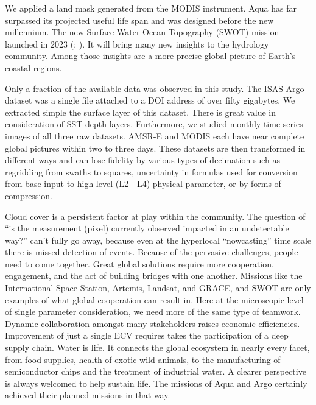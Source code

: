 \begin{refsection}
We applied a land mask generated from the MODIS instrument. Aqua has far surpassed its projected useful life span and was designed before the new millennium. The new Surface Water Ocean Topography (SWOT) mission launched in 2023 (\cite{fu2009swot}; \cite{morrow2019global}). It will bring many new insights to the hydrology community. Among those insights are a more precise global picture of Earth’s coastal regions. 

Only a fraction of the available data was observed in this study. The ISAS Argo dataset was a single file attached to a DOI address of over fifty gigabytes. We extracted simple the surface layer of this dataset. There is great value in consideration of SST depth layers. Furthermore, we studied monthly time series images of all three raw datasets. AMSR-E and MODIS each have near complete global pictures within two to three days. These datasets are then transformed in different ways and can lose fidelity by various types of decimation such as regridding from swaths to squares, uncertainty in formulas used for conversion from base input to high level (L2 - L4) physical parameter, or by forms of compression. 

Cloud cover is a persistent factor at play within the community. The question of “is the measurement (pixel) currently observed impacted in an undetectable way?” can’t fully go away, because even at the hyperlocal “nowcasting” time scale there is missed detection of events. Because of the pervasive challenges, people need to come together. Great global solutions require more cooperation, engagement, and the act of building bridges with one another. Missions like the International Space Station, Artemis, Landsat, and GRACE, and SWOT are only examples of what global cooperation can result in. Here at the microscopic level of single parameter consideration, we need more of the same type of teamwork. Dynamic collaboration amongst many stakeholders raises economic efficiencies. Improvement of just a single ECV requires takes the participation of a deep supply chain. Water is life. It connects the global ecosystem in nearly every facet, from food supplies, health of exotic wild animals, to the manufacturing of semiconductor chips and the treatment of industrial water. A clearer perspective is always welcomed to help sustain life. The missions of Aqua and Argo certainly achieved their planned missions in that way.


\end{refsection}
